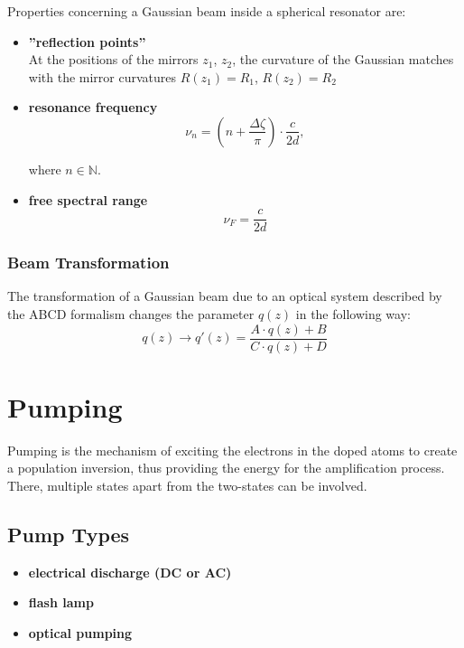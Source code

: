 \documentclass{article}
\newcommand{\lr}[1]{\left(#1\right)}
\begin{document}
Properties concerning a Gaussian beam inside a spherical resonator are:
	\begin{itemize}
		\item \textbf{''reflection points''}\\
		At the positions of the mirrors $z_1$, $z_2$, the curvature of the Gaussian matches with the mirror curvatures $R(z_1) = R_1$, $R(z_2) = R_2$
		
		
		\item \textbf{resonance frequency}
			\begin{equation}
				\nu_n = \lr{ n + \frac{\Delta\zeta}{\pi} } \cdot \frac{c}{2d},
			\end{equation}
		
		where $n\in\mathbb{N}$.
		

		\item \textbf{free spectral range}
			\begin{equation}
				\nu_F = \frac{c}{2d}
			\end{equation}
	\end{itemize}


\subsubsection*{Beam Transformation}
The transformation of a Gaussian beam due to an optical system described by the ABCD formalism changes the parameter $q(z)$ in the following way:
	\begin{equation}
		q(z) \to q'(z) = \frac{A \cdot q(z) + B}{C \cdot q(z) + D}
	\end{equation}


\newpage


\section{Pumping}
Pumping is the mechanism of exciting the electrons in the doped atoms to create a population inversion, thus providing the energy for the amplification process. There, multiple states apart from the two-states can be involved.


\subsection{Pump Types}
	\begin{itemize}
		\item \textbf{electrical discharge (DC or AC)}
		
		
		\item \textbf{flash lamp}
		
		
		\item \textbf{optical pumping}
	\end{itemize}
\end{document}
